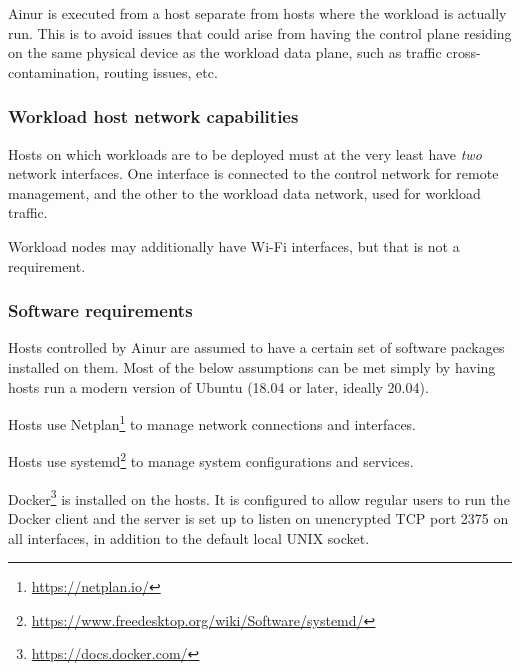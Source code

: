 Ainur is executed from a host separate from hosts where the workload is actually run.
This is to avoid issues that could arise from having the control plane residing on the same physical device as the workload data plane, such as traffic cross-contamination, routing issues, etc.

\subsubsection{Workload host network capabilities}

Hosts on which workloads are to be deployed must at the very least have \emph{two} network interfaces. 
One interface is connected to the control network for remote management, and the other to the workload data network, used for workload traffic.

Workload nodes may additionally have Wi-Fi interfaces, but that is not a requirement.

\subsubsection{Software requirements}

Hosts controlled by Ainur are assumed to have a certain set of software packages installed on them.
Most of the below assumptions can be met simply by having hosts run a modern version of Ubuntu (18.04 or later, ideally 20.04).

\begin{description}[style=unboxed]


    \item[Netplan]
    
    Hosts use Netplan\footnote{\url{https://netplan.io/}} to manage network connections and interfaces.
    
    \item[systemd]
    
    Hosts use systemd\footnote{\url{https://www.freedesktop.org/wiki/Software/systemd/}} to manage system configurations and services.
    
    \item[Docker]
    
    Docker\footnote{\url{https://docs.docker.com/}} is installed on the hosts.
    It is configured to allow regular users to run the Docker client and the server is set up to listen on unencrypted \gls{TCP} port \num{2375} on all interfaces, in addition to the default local UNIX socket.
\end{description}


